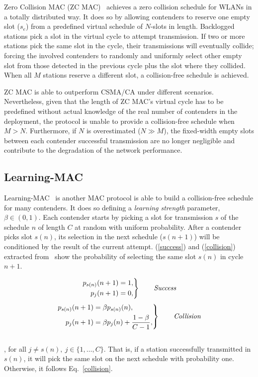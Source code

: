 \documentclass[a4paper,journal]{IEEEtran}
\begin{document}
Zero Collision MAC (ZC MAC)~\cite{ZMAC} achieves a zero collision schedule for WLANs in a totally distributed way. It does so by allowing contenders to reserve one empty slot ($s_{e}$) from a  predefined virtual schedule of $N$-slots in length. Backlogged stations pick a slot in the virtual cycle to attempt transmission. If two or more stations pick the same slot in the cycle, their transmissions will eventually collide; forcing the involved contenders to randomly and uniformly select other empty slot from those detected in the previous cycle plus the slot where they collided. When all $M$ stations reserve a different slot, a collision-free schedule is achieved.

ZC MAC is able to outperform CSMA/CA under different scenarios. Nevertheless, given that the length of ZC MAC's virtual cycle has to be predefined without actual knowledge of the real number of contenders in the deployment, the protocol is unable to provide a collision-free schedule when $M>N$. Furthermore, if $N$ is overestimated ($N\gg M$), the fixed-width empty slots between each contender successful transmission are no longer negligible and contribute to the degradation of the network performance.


\subsection{Learning-MAC}

Learning-MAC~\cite{L_MAC} is another MAC protocol is able to build a collision-free schedule for many contenders. It does so defining a \emph{learning strength} parameter, $\beta\in(0,1)$. Each contender starts by picking a slot for transmission $s$ of the schedule $n$ of length $C$ at random with uniform probability. After a contender picks slot $s(n)$, its selection in the next schedule ($s(n+1)$) will be conditioned by the result of the current attempt. (\ref{success}) and (\ref{collision}) extracted from~\cite{L_MAC} show the probability of selecting the same slot $s(n)$ in cycle $n+1$.

\begin{equation} \label{success}
		\left. \begin{aligned}
			p_{s(n)}(n+1)&=1,\\
			p_{j}(n+1)&=0,
		\end{aligned}
	\right\}
	\qquad \text{\emph{Success}}
\end{equation}
\begin{equation} \label{collision}
	\left. \begin{aligned}
			p_{s(n)}(n+1)&=\beta p_{s(n)}(n),\\
			p_{j}(n+1)&=\beta p_{j}(n)+\frac{1-\beta}{C -1},
		\end{aligned}
	\right\}
	\qquad \text{\emph{Collision}}
\end{equation}
\\
, for all $j\neq s(n),~j\in \{1,\dots ,C\}$. That is, if a station successfully transmitted in $s(n)$, it will pick the same slot on the next schedule with probability one. Otherwise, it follows Eq.~\ref{collision}.
\end{document}
